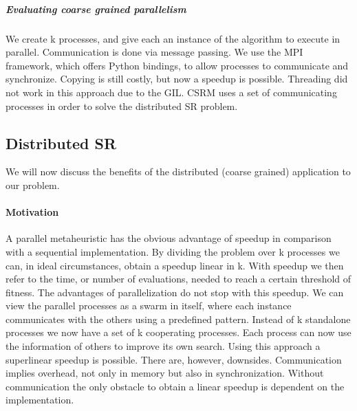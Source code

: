 \subparagraph{Evaluating coarse grained parallelism}
We create k processes, and give each an instance of the algorithm to execute in parallel. Communication is done via message passing. We use the MPI framework, which offers Python bindings, to allow processes to communicate and synchronize. Copying is still costly, but now a speedup is possible. Threading did not work in this approach due to the GIL.
CSRM uses a set of communicating processes in order to solve the distributed SR problem.

\subsection{Distributed SR}
We will now discuss the benefits of the distributed (coarse grained) application to our problem.

\paragraph{Motivation}
A parallel metaheuristic has the obvious advantage of speedup in comparison with a sequential implementation. By dividing the problem over k processes we can, in ideal circumstances, obtain a speedup linear in k. With speedup we then refer to the time, or number of evaluations, needed to reach a certain threshold of fitness. The advantages of parallelization do not stop with this speedup. We can view the parallel processes as a swarm in itself, where each instance communicates with the others using a predefined pattern. Instead of k standalone processes we now have a set of k cooperating  processes. Each process can now use the information of others to improve its own search. Using this approach a superlinear speedup is possible. There are, however, downsides. Communication implies overhead, not only in memory but also in synchronization. Without communication the only obstacle to obtain a linear speedup is dependent on the implementation. 

